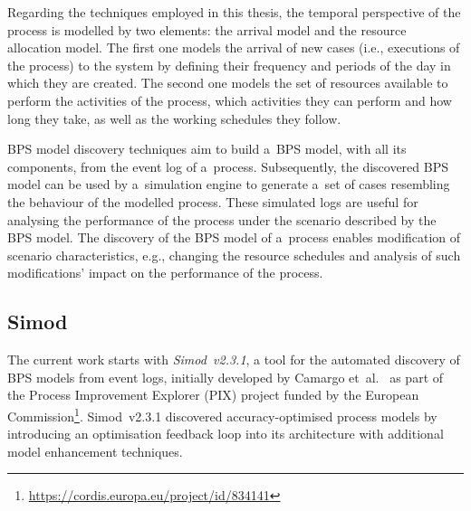 \documentclass[12pt]{article}
\begin{document}
Regarding the techniques employed in this thesis, the temporal perspective of the process is modelled by two elements: the arrival model and the resource allocation model.
The first one models the arrival of new cases (i.e., executions of the process) to the system by defining their frequency and periods of the day in which they are created.
The second one models the set of resources available to perform the activities of the process, which activities they can perform and how long they take, as well as the working schedules they follow.

BPS model discovery techniques aim to build a~BPS model, with all its components, from the event log of a~process.
Subsequently, the discovered BPS model can be used by a~simulation engine to generate a~set of cases resembling the behaviour of the modelled process.
These simulated logs are useful for analysing the performance of the process under the scenario described by the BPS model.
The discovery of the BPS model of a~process enables modification of scenario characteristics, e.g., changing the resource schedules and analysis of such modifications' impact on the performance of the process.


\subsection{Simod} \label{ch:background_simod}

The current work starts with \emph{Simod~v2.3.1}, a tool for the automated discovery of BPS models from event logs, initially developed by Camargo et~al.~\cite{camargo_automated_2020, camargo_simod_2021} as part of the Process Improvement Explorer (PIX) project funded by the European Commission\footnote{\href{https://cordis.europa.eu/project/id/834141}{https://cordis.europa.eu/project/id/834141}}. Simod~v2.3.1 discovered accuracy-optimised process models by introducing an optimisation feedback loop into its architecture with additional model enhancement techniques. 
\end{document}
